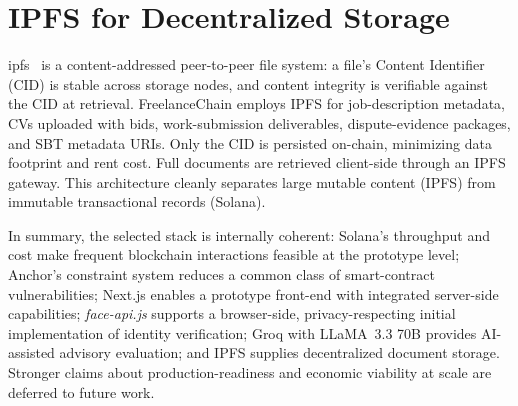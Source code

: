 \section{IPFS for Decentralized Storage}
\label{section:3.7}

\gls{ipfs}~\cite{ipfs2015} is a content-addressed peer-to-peer file system: a file's Content Identifier (CID) is stable across storage nodes, and content integrity is verifiable against the CID at retrieval. FreelanceChain employs IPFS for job-description metadata, CVs uploaded with bids, work-submission deliverables, dispute-evidence packages, and SBT metadata URIs. Only the CID is persisted on-chain, minimizing data footprint and rent cost. Full documents are retrieved client-side through an IPFS gateway. This architecture cleanly separates large mutable content (IPFS) from immutable transactional records (Solana).

In summary, the selected stack is internally coherent: Solana's throughput and cost make frequent blockchain interactions feasible at the prototype level; Anchor's constraint system reduces a common class of smart-contract vulnerabilities; Next.js enables a prototype front-end with integrated server-side capabilities; \emph{face-api.js} supports a browser-side, privacy-respecting initial implementation of identity verification; Groq with LLaMA~3.3 70B provides AI-assisted advisory evaluation; and IPFS supplies decentralized document storage. Stronger claims about production-readiness and economic viability at scale are deferred to future work.

